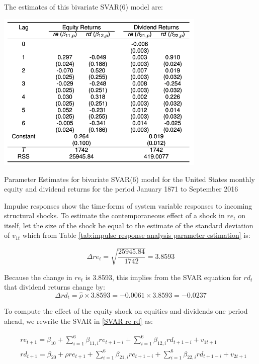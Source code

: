 \documentclass[11pt]{article}
\begin{document}
The estimates of this bivariate SVAR(6) model are:
\begin{table}[h]
    \centering
        \includegraphics[width=10cm]{pics/impulse response parameter estimates.png}
    \caption{Parameter Estimates for bivariate SVAR(6) model for the United States monthly equity and dividend returns for the period January 1871 to September 2016}
    \label{tab:impulse response analysis parameter estimation}
\end{table}


Impulse responses show the time-forms of system variable responses to incoming structural shocks. To estimate the contemporaneous effect of a shock in $re_t$ on itself, let the size of the shock be equal to the estimate of the standard deviation of $v_{1t}$ which from Table \ref{tab:impulse response analysis parameter estimation} is:

\[\Delta r e_t=\sqrt{\frac{25945.84}{1742}}=3.8593\]

Because the change in $re_t$ is 3.8593, this implies from the SVAR equation for $rd_t$ that dividend returns change by:
\begin{equation}
\Delta r d_t=\widehat{\rho} \times 3.8593=-0.0061 \times 3.8593=-0.0237
\end{equation}

To compute the effect of the equity shock on equities and dividends one period ahead, we rewrite the SVAR in \eqref{SVAR re rd} as:

\begin{equation}
\label{SVAR one period ahead}
\begin{aligned}
& r e_{t+1}=\beta_{10}+\sum_{i=1}^6 \beta_{11, i} r e_{t+1-i}+\sum_{i=1}^6 \beta_{12, i} r d_{t+1-i}+v_{1 t+1} \\
& r d_{t+1}=\beta_{20}+\rho r e_{t+1}+\sum_{i=1}^6 \beta_{21, i} r e_{t+1-i}+\sum_{i=1}^6 \beta_{22, i} r d_{t+1-i}+v_{2 t+1}
\end{aligned}
\end{equation}
\end{document}
